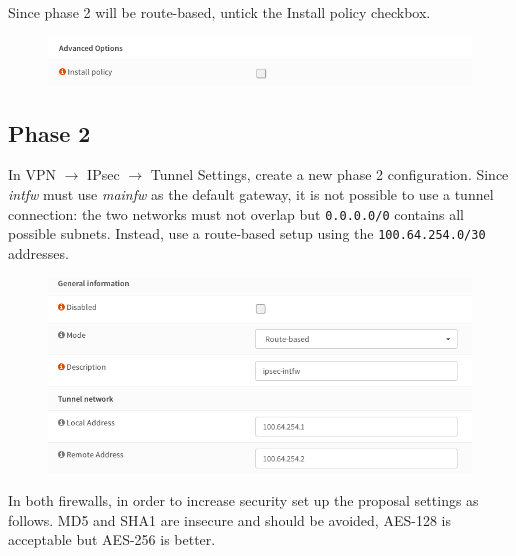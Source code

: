 \documentclass{homework}
\newcommand{\intfw}{\textit{intfw}\xspace}
\newcommand{\mainfw}{\textit{mainfw}\xspace}
\begin{document}
    \vspace{-10pt}
%
    Since phase 2 will be route-based, untick the Install policy checkbox.
    \vspace{-5pt}
    \begin{figure}[H]
        \centering
        \includegraphics[width=\linewidth]{ipsec/phase1-advanced}
        \label{fig:ipsec-phase1-advanced}
    \end{figure}
    
    \subsection{Phase 2}
    In VPN $\rightarrow$ IPsec $\rightarrow$ Tunnel Settings, create a new phase 2 configuration.
    Since \intfw must use \mainfw as the default gateway, it is not possible to use a tunnel connection: the two networks must not overlap but \texttt{0.0.0.0/0} contains all possible subnets.
    Instead, use a route-based setup using the \texttt{100.64.254.0/30} addresses.
    \begin{figure}[H]
        \centering
        \includegraphics[width=\linewidth]{ipsec/phase2-general}
        \label{fig:ipsec-phase2-general}
    \end{figure}
%
    In both firewalls, in order to increase security set up the proposal settings as follows.
    MD5 and SHA1 are insecure and should be avoided, AES-128 is acceptable but AES-256 is better.
\end{document}
